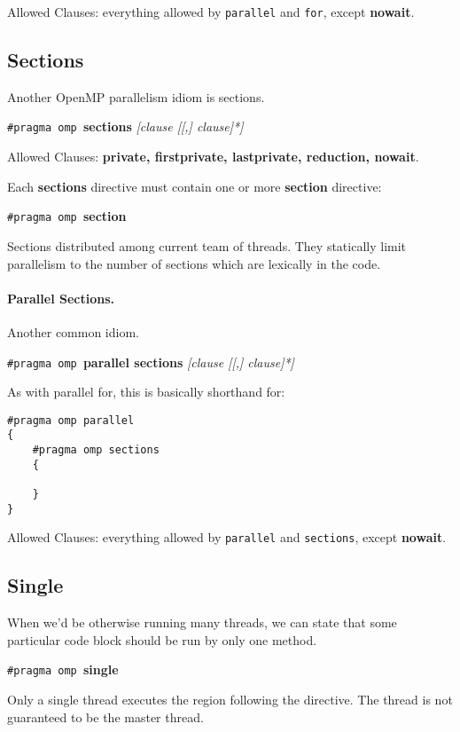 Allowed Clauses: everything allowed by {\tt parallel} and {\tt for}, except
  {\bf nowait}.

\subsection*{Sections}
Another OpenMP parallelism idiom is sections.
  \begin{center}
    {\tt \#pragma omp }{\bf sections} {\it [clause [[,] clause]*]}
  \end{center}

  Allowed Clauses: {\bf private, firstprivate, lastprivate, reduction, nowait}.

Each {\bf sections} directive must contain one or more {\bf section} directive:
  \begin{center}
    {\tt \#pragma omp }{\bf section}
  \end{center}
  
Sections distributed among current team of threads.
They statically limit parallelism to the number of
      sections which are lexically in the code.

\paragraph{Parallel Sections.} Another common idiom.
  \begin{center}
    {\tt \#pragma omp }{\bf parallel sections} {\it [clause [[,] clause]*]}
  \end{center}

  As with parallel for, this is basically shorthand for:
  
  \begin{lstlisting}
#pragma omp parallel
{
    #pragma omp sections
    {

    }
}
  \end{lstlisting}

  Allowed Clauses: everything allowed by {\tt parallel} and {\tt sections}, except
  {\bf nowait}.

  \subsection*{Single} When we'd be otherwise running many threads, we can state
that some particular code block should be run by only one method.

  \begin{center}
    {\tt \#pragma omp }{\bf single}
  \end{center}
    Only a single thread executes the region following the directive.
    The thread is not guaranteed to be the master thread.

